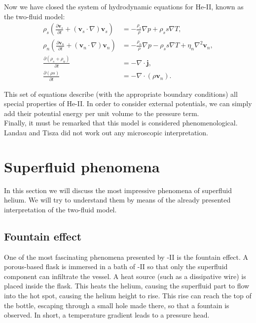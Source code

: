 \documentclass{article}
\begin{document}
Now we have closed the system of hydrodynamic equations for He-II, known as the two-fluid model:
\begin{align}
\rho_s \left( \frac{\partial \mathbf{v}_s}{\partial t} + (\mathbf{v}_s \cdot \nabla) \mathbf{v}_s \right) &= -\frac{\rho_s}{\rho} \nabla p + \rho_s s \nabla T, \label{hyd:1} \\
\rho_n \left( \frac{\partial \mathbf{v}_n}{\partial t} + (\mathbf{v}_n \cdot \nabla) \mathbf{v}_n \right) &= -\frac{\rho_n}{\rho} \nabla p - \rho_s s \nabla T + \eta_n \nabla^2 \mathbf{v}_n, \label{hyd:2}  \\
\frac{\partial (\rho_s + \rho_n)}{\partial t} &= -\nabla \cdot \mathbf{j}, \label{hyd:3} \\
\frac{\partial (\rho s)}{\partial t} &= -\nabla \cdot (\rho \mathbf{v}_n). \label{hyd:4} 
\end{align}

This set of equations describe (with the appropriate boundary conditions) all special properties of He-II\@. In order to consider external potentials, we can simply add their potential energy per unit volume to the pressure term. 
\\

Finally, it must be remarked that this model is considered phenomenological. Landau and Tisza did not work out any microscopic interpretation. 

\section{Superfluid phenomena}

In this section we will discuss the most impressive phenomena of superfluid helium. We will try to understand them by means of the already presented interpretation of the two-fluid model.

\subsection{Fountain effect}


One of the most fascinating phenomena presented by -II is the fountain effect. A porous-based flask is immersed in a bath of -II so that only the superfluid component can infiltrate the vessel. A heat source (such as a dissipative wire) is placed inside the flask. This heats the helium, causing the superfluid part to flow into the hot spot, causing the helium height to rise. This rise can reach the top of the bottle, escaping through a small hole made there, so that a fountain is observed. In short, a temperature gradient leads to a pressure head.
\\
\end{document}
